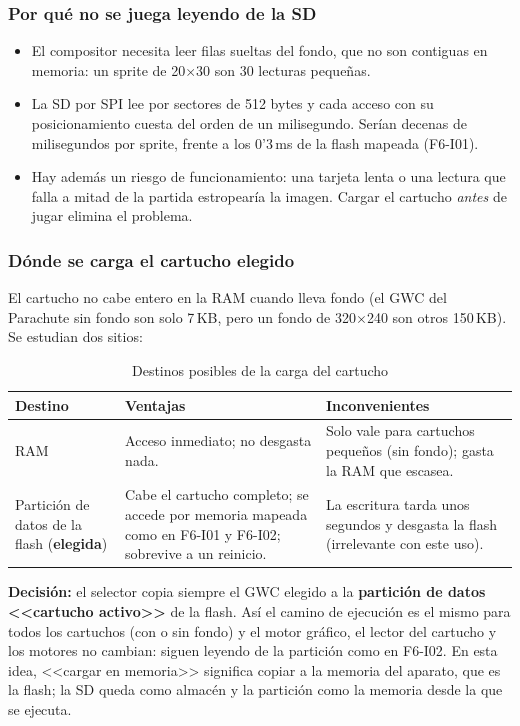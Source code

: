 \subsubsection{Por qué no se juega leyendo de la SD}

\begin{itemize}
	\item El compositor necesita leer filas sueltas del fondo, que no son contiguas en memoria: un sprite de 20$\times$30 son 30 lecturas pequeñas.
	\item La SD por SPI lee por sectores de 512 bytes y cada acceso con su posicionamiento cuesta del orden de un milisegundo. Serían decenas de milisegundos por sprite, frente a los 0'3\,ms de la flash mapeada (F6-I01).
	\item Hay además un riesgo de funcionamiento: una tarjeta lenta o una lectura que falla a mitad de la partida estropearía la imagen. Cargar el cartucho \emph{antes} de jugar elimina el problema.
\end{itemize}

\subsubsection{Dónde se carga el cartucho elegido}

El cartucho no cabe entero en la RAM cuando lleva fondo (el GWC del Parachute sin fondo son solo 7\,KB, pero un fondo de 320$\times$240 son otros 150\,KB). Se estudian dos sitios:

\begin{table}[H]
	\centering
	\begin{tabular}{p{3.2cm}p{4.5cm}p{4.5cm}}
		\toprule
		Destino & Ventajas & Inconvenientes \\
		\midrule
		RAM & Acceso inmediato; no desgasta nada. & Solo vale para cartuchos pequeños (sin fondo); gasta la RAM que escasea. \\
		Partición de datos de la flash (\textbf{elegida}) & Cabe el cartucho completo; se accede por memoria mapeada como en F6-I01 y F6-I02; sobrevive a un reinicio. & La escritura tarda unos segundos y desgasta la flash (irrelevante con este uso). \\
		\bottomrule
	\end{tabular}
	\caption{Destinos posibles de la carga del cartucho}
	\label{tab:F7I01Destinos}
\end{table}

\textbf{Decisión:} el selector copia siempre el GWC elegido a la \textbf{partición de datos <<cartucho activo>>} de la flash. Así el camino de ejecución es el mismo para todos los cartuchos (con o sin fondo) y el motor gráfico, el lector del cartucho y los motores no cambian: siguen leyendo de la partición como en F6-I02. En esta idea, <<cargar en memoria>> significa copiar a la memoria del aparato, que es la flash; la SD queda como almacén y la partición como la memoria desde la que se ejecuta.

